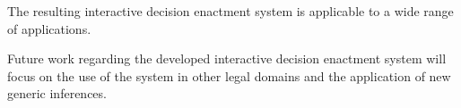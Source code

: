 \begin{comment}
In particular, we have implemented two pieces of functionality that were not originally foreseen when the knowledge base was developed, but that were demanded later by the notary office. We did so by applying two fully generic inferences to the existing knowledge base. 


The \emph{relevance} inference addresses the need for efficient information gathering, as it narrows down the entire set of undecided atoms to those that matter for top-level decisions.
This helps the notary avoid requesting superfluous information from his clients.
Once an atom is propagated by the system, the \emph{explanation} inference allows to explore why this particular outcome is implied.



More generally, the contributions of this paper are validation of the claims that knowledge bases are easy to maintain, even in the face of considerable changes in the domain; and that knowledge bases can be reused for other, unanticipated inference tasks.


It also shows a first-time integration of the relevance and explanation inferences in an interactive application, and demonstrates their practical utility.  
\end{comment}
The resulting interactive decision enactment system is applicable to a wide range of applications.
\begin{comment}


We are already investigating another application, coincidentally also in the legal field, is the creation of a knowledge base that supports decision making given the Belgian legislation on public procurement.
Furthermore, it would be valuable to develop a variant of the explanation inference that not only reports a user's choices that lead to a propagation, but also the constraints and/or rules that trigger the propagation. In the legal domain, this would be useful to argue which laws or legal texts enforce a particular outcome under the current choices. E.g., it could point a jurist to a precedent applicable to the case at hand.
\end{comment}
Future work regarding the developed interactive decision enactment system will focus on the use of the system in other legal domains and the application of new generic inferences.
